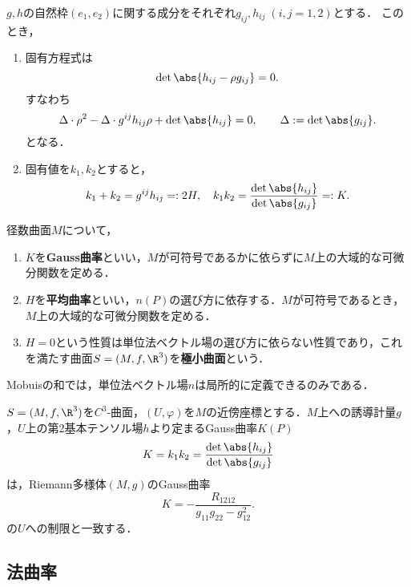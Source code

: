 \documentclass[uplatex,dvipdfmx]{jsreport}
\begin{document}
\begin{proposition}
    $g,h$の自然枠$(e_1,e_2)$に関する成分をそれぞれ$g_{ij},h_{ij}\;(i,j=1,2)$とする．
    このとき，
    \begin{enumerate}
        \item 固有方程式は
        \[\det\abs{h_{ij}-\rho g_{ij}}=0.\]
        すなわち
        \[\Delta\cdot\rho^2-\Delta\cdot g^{ij}h_{ij}\rho+\det\abs{h_{ij}}=0,\qquad\Delta:=\det\abs{g_{ij}}.\]
        となる．
        \item 固有値を$k_1,k_2$とすると，
        \[k_1+k_2=g^{ij}h_{ij}=:2H,\quad k_1k_2=\frac{\det\abs{h_{ij}}}{\det\abs{g_{ij}}}=:K.\]
    \end{enumerate}
\end{proposition}

\begin{definition}
    径数曲面$M$について，
    \begin{enumerate}
        \item $K$を\textbf{Gauss曲率}といい，$M$が可符号であるかに依らずに$M$上の大域的な可微分関数を定める．
        \item $H$を\textbf{平均曲率}といい，$n(P)$の選び方に依存する．$M$が可符号であるとき，$M$上の大域的な可微分関数を定める．
        \item $H=0$という性質は単位法ベクトル場の選び方に依らない性質であり，これを満たす曲面$S=(M,f,\R^3)$を\textbf{極小曲面}という．
    \end{enumerate}
\end{definition}

\begin{example}
    Mobuisの和では，単位法ベクトル場$n$は局所的に定義できるのみである．
\end{example}

\begin{theorem}[Gaussの驚異定理]
    $S=(M,f,\R^3)$を$C^3$-曲面，$(U,\varphi)$を$M$の近傍座標とする．$M$上への誘導計量$g$，$U$上の第2基本テンソル場$h$より定まるGauss曲率$K(P)$
    \[K=k_1k_2=\frac{\det\abs{h_{ij}}}{\det\abs{g_{ij}}}\]
    は，Riemann多様体$(M,g)$のGauss曲率
    \[K=-\frac{R_{1212}}{g_{11}g_{22}-g_{12}^2}.\]
    の$U$への制限と一致する．
\end{theorem}

\subsection{法曲率}
\end{document}

